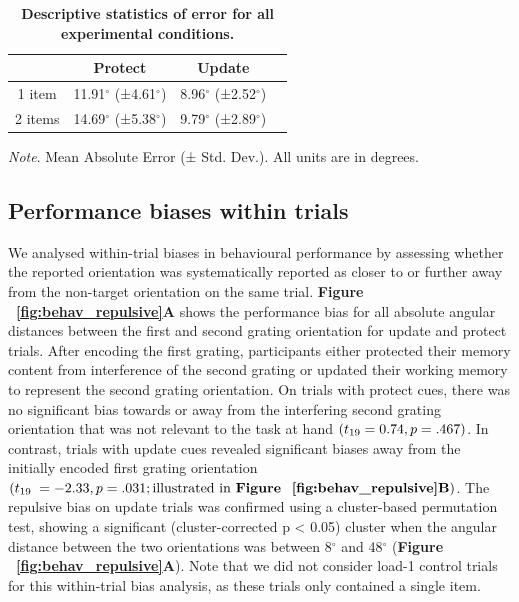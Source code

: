 \documentclass{article}
\begin{document}
\begin{table}[htpb]

\begin{center}
\caption{\textbf{Descriptive statistics of error for all experimental conditions.}}

\begin{tabular}{cccc}

\toprule
& \textbf{Protect} & \textbf{Update} \\
\midrule
1 item & 11.91$^{\circ}$ (±4.61$^{\circ}$) & 8.96$^{\circ}$ (±2.52$^{\circ}$)  \\
2 items & 14.69$^{\circ}$ (±5.38$^{\circ}$) & 9.79$^{\circ}$ (±2.89$^{\circ}$)  \\
\bottomrule
\end{tabular}
\end{center}


\begin{center}
\small\textit{Note}. \fontsize{10}{12}\selectfont Mean Absolute Error (± Std. Dev.). All units are in degrees.
\end{center}
\label{table:error_rates}
\end{table}

\subsection{Performance biases within trials}
We analysed within-trial biases in behavioural performance by assessing whether the reported orientation was systematically reported as closer to or further away from the non-target orientation on the same trial. \textbf{Figure ~\ref{fig:behav_repulsive}A} shows the performance bias for all absolute angular distances between the first and second grating orientation for update and protect trials. After encoding the first grating, participants either protected their memory content from interference of the second grating or updated their working memory to represent the second grating orientation. On trials with protect cues, there was no significant bias towards or away from the interfering second grating orientation that was not relevant to the task at hand $(t\textsubscript{19} = 0.74, p = .467)$. In contrast, trials with update cues revealed significant biases away from the initially encoded first grating orientation $(t\textsubscript{19 }= -2.33, p = .031; \text{illustrated in \textbf{Figure ~\ref{fig:behav_repulsive}B}})$. The repulsive bias on update trials was confirmed using a cluster-based permutation test, showing a significant (cluster-corrected p < 0.05) cluster when the angular distance between the two orientations was between 8$^{\circ}$ and 48$^{\circ}$ (\textbf{Figure ~\ref{fig:behav_repulsive}A}). Note that we did not consider load-1 control trials for this within-trial bias analysis, as these trials only contained a single item. \\
\end{document}

